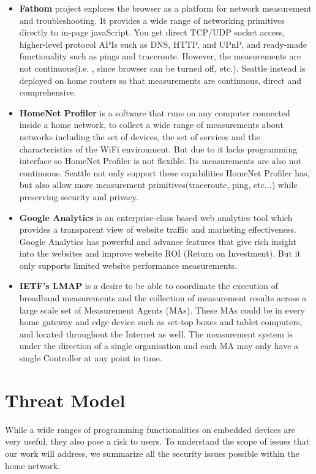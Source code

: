 \documentclass[11pt, oneside]{article}   	%
\begin{document}
\begin{itemize}
\item \textbf{Fathom} project explores the browser as a platform for network measurement and troubleshooting. It provides a wide range of networking primitives directly to in-page javaScript. You get direct TCP/UDP socket access, higher-level protocol APIs such as DNS, HTTP, and UPnP, and ready-made functionality such as pings and traceroute. However, the measurements are not continuous(i.e. , since browser can be turned off, etc.). Seattle instead is deployed on home routers so that measurements are continuous, direct and comprehensive.
\item \textbf{HomeNet Profiler} is a software that runs on any computer connected inside a home network, to collect a wide range of measurements about networks including the set of devices, the set of services and the characteristics of the WiFi environment. But due to it lacks programming interface so HomeNet Profiler is not flexible. Its measurements are also not continuous. Seattle not only support these capabilities HomeNet Profiler has, but also allow more measurement primitives(traceroute, ping, etc...) while preserving security and privacy.
\item \textbf{Google Analytics} is an enterprise-class based web analytics tool which provides a transparent view of website traffic and marketing effectiveness. Google Analytics has powerful and advance features that give rich insight into the websites and improve website ROI (Return on Investment). But it only supports limited website performance measurements.
\item \textbf{IETF's LMAP} is a desire to be able to coordinate the execution of broadband measurements and the collection of measurement results across a large scale set of Measurement Agents (MAs). These MAs could be in every home gateway and edge device such as set-top boxes and tablet computers, and located throughout the Internet as well. The measurement system is under the direction of a single organisation and each MA may only have a single Controller at any point in time.
\end{itemize}

\section{Threat Model}
\label{sec.threat_model}
While a wide ranges of programming functionalities on embedded devices are very useful, they also pose a risk to users. To understand the scope of issues that our work will address, we summarize all the security issues possible within the home network.
\end{document}
